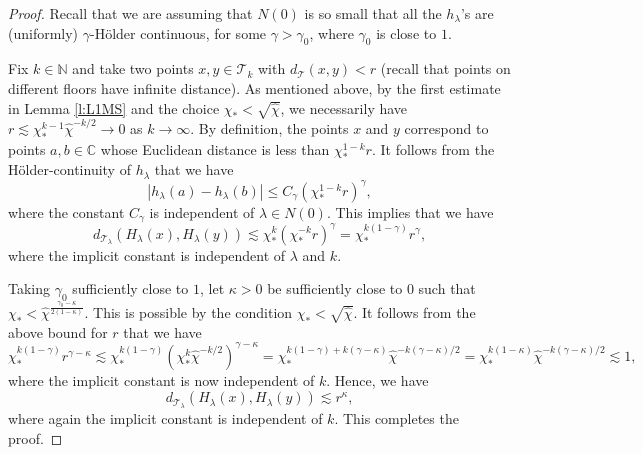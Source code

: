 \documentclass[11pt]{amsart}
\theoremstyle{plain}
\theoremstyle{definition}
\theoremstyle{remark}
\begin{document}
\begin{proof}
Recall that we are assuming that $N(0)$ is so small that 
all the $h_\lambda$'s are (uniformly) $\gamma$-H\"older continuous, for some $\gamma >\gamma_0$, where $\gamma_0$ is close to $1$.

Fix $k\in \mathbb N$ and take two points $x,y\in \mathcal T_k$ with $d_{\mathcal T} (x,y)<r$
(recall that points on different floors have infinite distance). 
As mentioned above, 
by the first estimate in Lemma \ref{l:L1MS}
and the choice
$\chi_*<\sqrt{\hat\chi}$,
 we necessarily have $r\lesssim \chi_*^{k-1} 
 \hat \chi^{-k/2}\to 0$ as $k\to \infty$. 
By definition, the
points $x$ and $y$
correspond
to points $a,b\in\mathbb C$ whose Euclidean distance is less than $\chi_*^{1-k}r$.
It 
follows from the H\"older-continuity of $h_\lambda$ 
 that we have
\[
|h_\lambda (a)- h_\lambda (b)|\leq C_\gamma
(\chi_*^{1-k}r)^\gamma,
\]
where the constant $C_\gamma$ is independent of $\lambda\in N(0)$.
This implies that we have
\[
d_{\mathcal T_\lambda} (H_\lambda (x), H_\lambda (y))
\lesssim \chi_*^{k}
(\chi_*^{-k} r)^{\gamma} 
=
\chi_*^{k (1-\gamma)}
 r^{\gamma},
\]
where the
implicit constant is independent of $\lambda$ and $k$.

Taking $\gamma_0$ sufficiently close to $1$, let $\kappa >0$ be sufficiently close to $0$ such that $\chi_*< \hat \chi^{\frac{\gamma_0-\kappa}{2(1-\kappa)}}$. This is possible by the condition $\chi_* < \sqrt{\hat \chi}$.
It follows from the above bound for $r$ 
that
we have
\[
\chi_*^{k (1-\gamma)}
 r^{\gamma-\kappa} \lesssim
 \chi_*^{k (1-\gamma)}
 (\chi_*^{k} \hat{\chi}^{-k/2})^{\gamma-\kappa}
=
\chi_*^{k(1-\gamma) +k(\gamma-\kappa)} 
 \hat{\chi}^{-k(\gamma-\kappa)/2} 
 =
 \chi_*^{k(1-\kappa)}
 \hat{\chi}^{-k(\gamma-\kappa)/2}\lesssim 1,\]
 where the implicit constant is now independent of $k$.
Hence, 
we have
\[
d_{\mathcal T_\lambda} (H_\lambda (x), H_\lambda (y))
\lesssim  r^{\kappa},
\]
where again the implicit constant is independent of $k$.
This completes the proof.
\end{proof}
\end{document}
